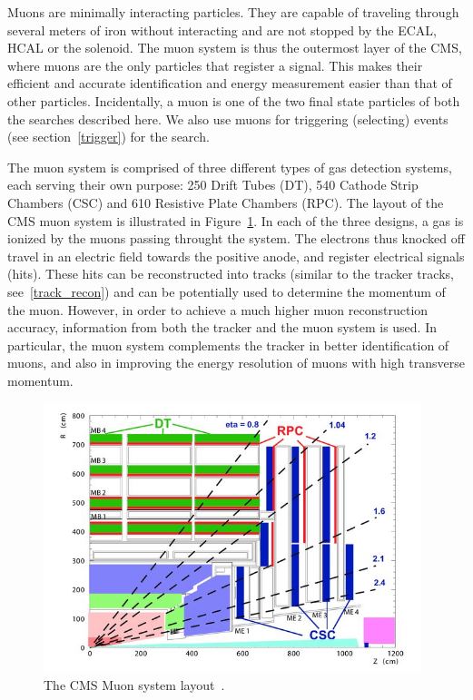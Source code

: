 Muons are minimally interacting particles. They are capable of traveling through several meters of iron without interacting and are not stopped by the ECAL, HCAL or the solenoid. The muon system is thus the outermost layer of the CMS, where muons are the only particles that register a signal. This makes their efficient and accurate identification and energy measurement easier than that of other particles. Incidentally, a muon is one of the two final state particles of both the searches described here. We also use muons for triggering (selecting) events (see section~\ref{trigger}) for the search.

The muon system is comprised of three different types of gas detection systems, each serving their own purpose: 250 Drift Tubes (DT), 540 Cathode Strip Chambers (CSC) and 610 Resistive Plate Chambers (RPC). The layout of the CMS muon system is illustrated in Figure~\ref{fig:muon_system_layout}. In each of the three designs, a gas is ionized by the muons passing throught the system. The electrons thus knocked off travel in an electric field towards the positive anode, and register electrical signals (hits). These hits can be reconstructed into tracks (similar to the tracker tracks, see~\ref{track_recon}) and can be potentially used to determine the momentum of the muon. However, in order to achieve a much higher muon reconstruction accuracy, information from both the tracker and the muon system is used. In particular, the muon system complements the tracker in better identification of muons, and also in improving the energy resolution of muons with high transverse momentum.  

\begin{figure}
\begin{center}
  \includegraphics[width=0.98\textwidth,keepaspectratio]{plots_and_figures/chapter3/muon_system_layout.jpg}
\caption{The CMS Muon system layout~\cite{muon1}.}
\label{fig:muon_system_layout}
\end{center}
\end{figure}

